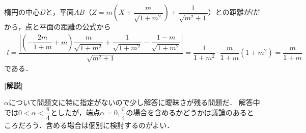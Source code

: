 \documentclass[../../main.tex]{subfiles}
\begin{document}
楕円の中心$D$と，平面$AB$（$Z=m\left(X+\dfrac{m}{\sqrt{1+m^2}}\right)+\dfrac{1}{\sqrt{m^2+1}}$）との距離が$l$だから，点と平面の距離の公式から
\begin{align}
  l=\dfrac{\left|\left(-\dfrac{2m}{1+m}+m\right)\dfrac{m}{\sqrt{1+m^2}}+\dfrac{1}{\sqrt{1+m^2}}-\dfrac{1-m}{\sqrt{1+m^2}}\right|}{\sqrt{m^2+1}}
  = \dfrac{1}{1+m^2}\cdot\dfrac{m}{1+m}(1+m^2) = \dfrac{m}{1+m}
\end{align}
である．

{\bf [解説]}

$\alpha$について問題文に特に指定がないので少し解答に曖昧さが残る問題だ．
解答中では$0<\alpha<\dfrac{\pi}{4}$としたが，端点$\alpha=0,\dfrac{\pi}{4}$の場合を含めるかどうかは議論のあるところだろう．含める場合は個別に検討するのがよい．

\newpage
\end{document}
